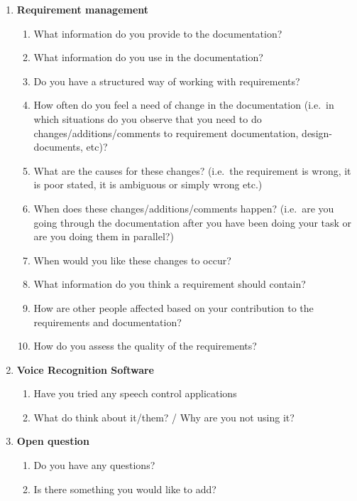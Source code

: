 \begin{enumerate}
\item \textbf{Requirement management}
\begin{enumerate}
\item What information do you provide to the documentation?
\item What information do you use in the documentation?
\item Do you have a structured way of working with requirements?
\item How often do you feel a need of change in the documentation (i.e.\ in which situations do you observe that you need to do changes/additions/comments to requirement documentation, design-documents, etc)?
\item What are the causes for these changes? (i.e.\ the requirement is wrong, it is poor stated, it is ambiguous or simply wrong etc.)
\item When does these changes/additions/comments happen? (i.e.\ are you going through the documentation after you have been doing your task or are you doing them in parallel?)
\item When would you like these changes to occur?
\item What information do you think a requirement should contain?
\item How are other people affected based on your contribution to the requirements and documentation?
\item How do you assess the quality of the requirements?
\end{enumerate}

\item \textbf{Voice Recognition Software}
\begin{enumerate}
\item Have you tried any speech control applications 
\item What do think about it/them? / Why are you not using it?
\end{enumerate}

\item \textbf{Open question}
\begin{enumerate}
\item Do you have any questions? 
\item Is there something you would like to add?
\end{enumerate}

\end{enumerate}











